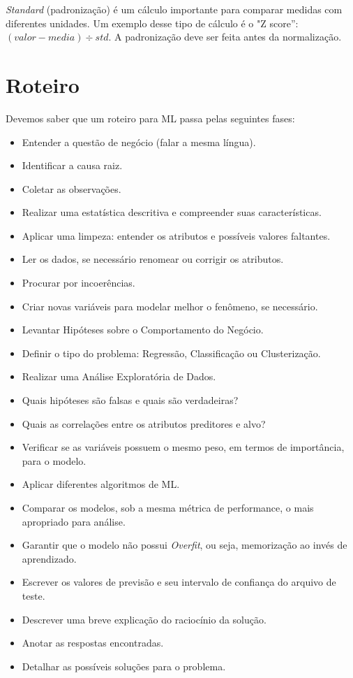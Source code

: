 \textit{Standard} (padronização) é um cálculo importante para comparar medidas com diferentes unidades. Um exemplo desse tipo de cálculo é o "Z score”: $(valor - media) \div std$. A padronização deve ser feita antes da normalização.

\section{Roteiro}
Devemos saber que um roteiro para ML passa pelas seguintes fases: \vspace{-1em}
\begin{itemize}[noitemsep]
	\item Entender a questão de negócio (falar a mesma língua).
	\item Identificar a causa raiz.
	\item Coletar as observações.
	\item Realizar uma estatística descritiva e compreender suas características.
	\item Aplicar uma limpeza: entender os atributos e possíveis valores faltantes.
	\item Ler os dados, se necessário renomear ou corrigir os atributos.
	\item Procurar por incoerências.
	\item Criar novas variáveis para modelar melhor o fenômeno, se necessário.
	\item Levantar Hipóteses sobre o Comportamento do Negócio.
	\item Definir o tipo do problema: Regressão, Classificação ou Clusterização.
	\item Realizar uma Análise Exploratória de Dados.
	\item Quais hipóteses são falsas e quais são verdadeiras?
	\item Quais as correlações entre os atributos preditores e alvo?
	\item Verificar se as variáveis possuem o mesmo peso, em termos de importância, para o modelo.
	\item Aplicar diferentes algoritmos de ML.
	\item Comparar os modelos, sob a mesma métrica de performance, o mais apropriado para análise.
	\item Garantir que o modelo não possui \textit{Overfit}, ou seja, memorização ao invés de aprendizado.
	\item Escrever os valores de previsão e seu intervalo de confiança do arquivo de teste.
	\item Descrever uma breve explicação do raciocínio da solução.
	\item Anotar as respostas encontradas.
	\item Detalhar as possíveis soluções para o problema.
\end{itemize}


